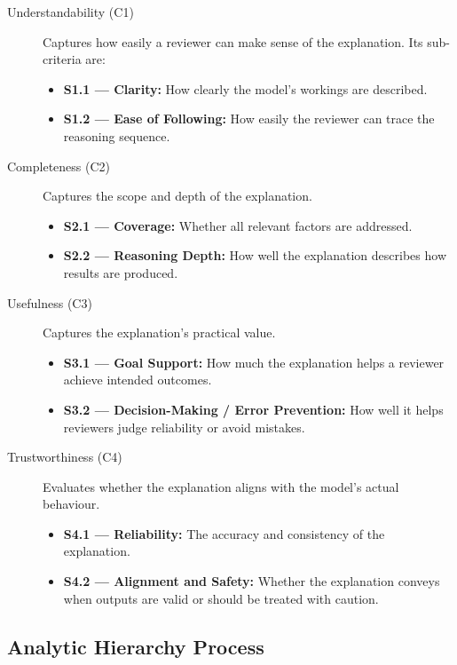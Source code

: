 \begin{description}
  \item[Understandability (C1)] Captures how easily a reviewer can make sense of
    the explanation. Its sub-criteria are:
    \begin{itemize}
      \item \textbf{S1.1 — Clarity:} How clearly the model's workings are described.
      \item \textbf{S1.2 — Ease of Following:} How easily the reviewer can trace the
        reasoning sequence.
    \end{itemize}

  \item[Completeness (C2)] Captures the scope and depth of the explanation.
    \begin{itemize}
      \item \textbf{S2.1 — Coverage:} Whether all relevant factors are addressed.
      \item \textbf{S2.2 — Reasoning Depth:} How well the explanation describes how
        results are produced.
    \end{itemize}

  \item[Usefulness (C3)] Captures the explanation's practical value.
    \begin{itemize}
      \item \textbf{S3.1 — Goal Support:} How much the explanation helps a reviewer
        achieve intended outcomes.
      \item \textbf{S3.2 — Decision-Making / Error Prevention:} How well it helps
        reviewers judge reliability or avoid mistakes.
    \end{itemize}

  \item[Trustworthiness (C4)] Evaluates whether the explanation aligns with the
    model's actual behaviour.
    \begin{itemize}
      \item \textbf{S4.1 — Reliability:} The accuracy and consistency of the
        explanation.
      \item \textbf{S4.2 — Alignment and Safety:} Whether the explanation conveys
        when outputs are valid or should be treated with caution.
    \end{itemize}
\end{description}

\subsection{Analytic Hierarchy Process}
\label{subsec:meth-ahp}

